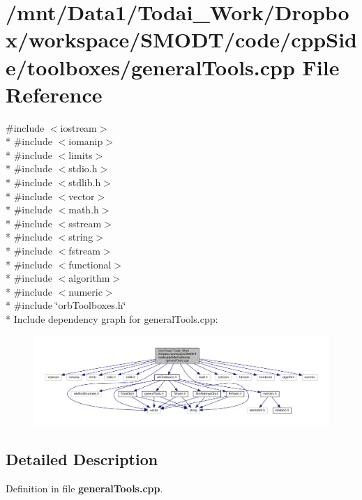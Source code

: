 \section{/mnt/\-Data1/\-Todai\-\_\-\-Work/\-Dropbox/workspace/\-S\-M\-O\-D\-T/code/cpp\-Side/toolboxes/general\-Tools.cpp File Reference}
\label{general_tools_8cpp}
{\ttfamily \#include $<$iostream$>$}\\*
{\ttfamily \#include $<$iomanip$>$}\\*
{\ttfamily \#include $<$limits$>$}\\*
{\ttfamily \#include $<$stdio.\-h$>$}\\*
{\ttfamily \#include $<$stdlib.\-h$>$}\\*
{\ttfamily \#include $<$vector$>$}\\*
{\ttfamily \#include $<$math.\-h$>$}\\*
{\ttfamily \#include $<$sstream$>$}\\*
{\ttfamily \#include $<$string$>$}\\*
{\ttfamily \#include $<$fstream$>$}\\*
{\ttfamily \#include $<$functional$>$}\\*
{\ttfamily \#include $<$algorithm$>$}\\*
{\ttfamily \#include $<$numeric$>$}\\*
{\ttfamily \#include \char`\"{}orb\-Toolboxes.\-h\char`\"{}}\\*
Include dependency graph for general\-Tools.\-cpp\-:\nopagebreak
\begin{figure}[H]
\begin{center}
\leavevmode
\includegraphics[width=350pt]{general_tools_8cpp__incl}
\end{center}
\end{figure}


\subsection{Detailed Description}


Definition in file {\bf general\-Tools.\-cpp}.

